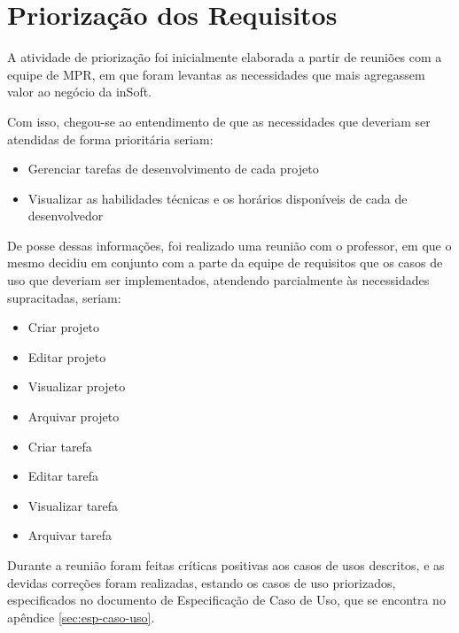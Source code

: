 \section{Priorização dos Requisitos}
\label{sec:priorizacao}

A atividade de priorização foi inicialmente elaborada a partir de reuniões com a equipe de MPR, em que foram levantas as necessidades que mais agregassem valor ao negócio da inSoft.

Com isso, chegou-se ao entendimento de que as necessidades que deveriam ser atendidas de forma prioritária seriam:

\begin{itemize}
  \item Gerenciar tarefas de desenvolvimento de cada projeto
  \item Visualizar as habilidades técnicas e os horários disponíveis de cada de desenvolvedor
\end{itemize}

De posse dessas informações, foi realizado uma reunião com o professor, em que o mesmo decidiu em conjunto com a parte da equipe de requisitos que os casos de uso que deveriam ser implementados, atendendo parcialmente às necessidades supracitadas, seriam:

\begin{itemize}
  \item Criar projeto
  \item Editar projeto
  \item Visualizar projeto
  \item Arquivar projeto
  \item Criar tarefa
  \item Editar tarefa
  \item Visualizar tarefa
  \item Arquivar tarefa
\end{itemize}

Durante a reunião foram feitas críticas positivas aos casos de usos descritos, e as devidas correções foram realizadas, estando os casos de uso priorizados, especificados no documento de Especificação de Caso de Uso, que se encontra no apêndice \ref{sec:esp-caso-uso}.
